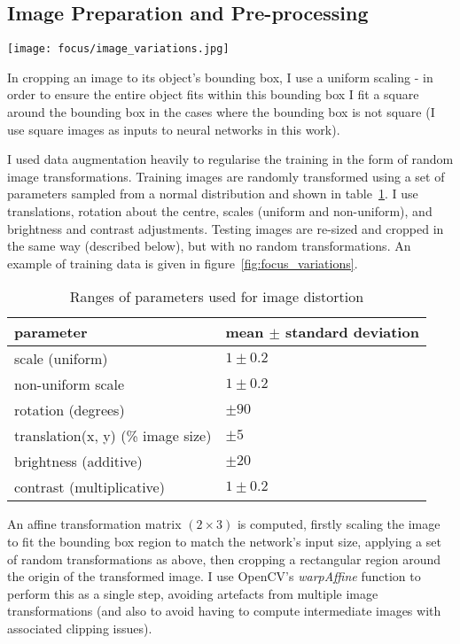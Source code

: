 \subsection {Image Preparation and Pre-processing}


\begin{figure*}[t]
    \caption{Examples of data augmentation }
\centering
\texttt{[image: focus/image\_variations.jpg]}
\label{fig:focus_variations}
\end{figure*}


In cropping an image to its object's bounding box, I use a uniform scaling - in order to ensure the entire object fits within this bounding box I fit a square around the bounding box in the cases where the bounding box is not square (I use square images as inputs to neural networks in this work).

I used data augmentation heavily to regularise the training in the form of random image transformations. Training images are randomly transformed using a set of parameters sampled from a normal distribution and shown in table~\ref{fig:focus_jitter}.  I use translations, rotation about the centre, scales (uniform and non-uniform), and brightness and contrast adjustments. Testing images are re-sized and cropped in the same way (described below), but with no random transformations. An example of training data is given in figure~\ref{fig:focus_variations}.

\begin{table}[h]
  \centering
    \caption{Ranges of parameters used for image distortion }
    
  \begin{tabular}{ l  l }
    parameter & mean $ \pm $ standard deviation \\
    \toprule
    scale (uniform) & $ 1 \pm 0.2 $  \\ 
    non-uniform scale  & $ 1 \pm 0.2 $  \\ 
    rotation (degrees) & $ \pm 90 $ \\ 
    translation(x, y) (\% image size) & $ \pm 5 $ \\ 
    brightness (additive) & $ \pm 20 $ \\ 
    contrast (multiplicative) & $ 1 \pm 0.2 $ \\ 
    \bottomrule
  \end{tabular}
\label{fig:focus_jitter}
\end{table}


An affine transformation matrix $ (2 \times 3) $ is computed, firstly scaling the image to fit the bounding box region to match the network's input size, applying a set of random transformations as above, then cropping a rectangular region around the origin of the transformed image. I use OpenCV's \emph{warpAffine} function to perform this as a single step, avoiding artefacts from multiple image transformations (and also to avoid having to compute intermediate images with associated clipping issues).

